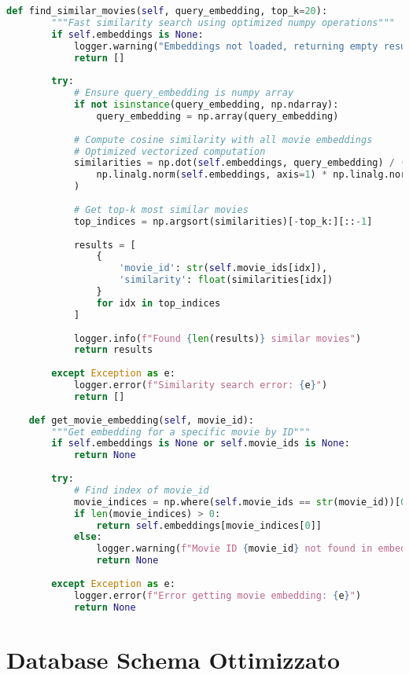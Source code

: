 \documentclass[11pt,a4paper]{article}
\begin{document}
\begin{lstlisting}[language=Python, caption=ONNX Inference Engine]
    def find_similar_movies(self, query_embedding, top_k=20):
        """Fast similarity search using optimized numpy operations"""
        if self.embeddings is None:
            logger.warning("Embeddings not loaded, returning empty results")
            return []
        
        try:
            # Ensure query_embedding is numpy array
            if not isinstance(query_embedding, np.ndarray):
                query_embedding = np.array(query_embedding)
            
            # Compute cosine similarity with all movie embeddings
            # Optimized vectorized computation
            similarities = np.dot(self.embeddings, query_embedding) / (
                np.linalg.norm(self.embeddings, axis=1) * np.linalg.norm(query_embedding)
            )
            
            # Get top-k most similar movies
            top_indices = np.argsort(similarities)[-top_k:][::-1]
            
            results = [
                {
                    'movie_id': str(self.movie_ids[idx]),
                    'similarity': float(similarities[idx])
                }
                for idx in top_indices
            ]
            
            logger.info(f"Found {len(results)} similar movies")
            return results
            
        except Exception as e:
            logger.error(f"Similarity search error: {e}")
            return []
    
    def get_movie_embedding(self, movie_id):
        """Get embedding for a specific movie by ID"""
        if self.embeddings is None or self.movie_ids is None:
            return None
        
        try:
            # Find index of movie_id
            movie_indices = np.where(self.movie_ids == str(movie_id))[0]
            if len(movie_indices) > 0:
                return self.embeddings[movie_indices[0]]
            else:
                logger.warning(f"Movie ID {movie_id} not found in embeddings")
                return None
                
        except Exception as e:
            logger.error(f"Error getting movie embedding: {e}")
            return None
\end{lstlisting}

\section{Database Schema Ottimizzato}
\end{document}

